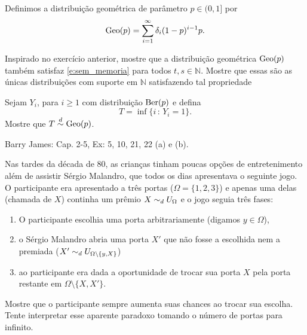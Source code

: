 Definimos a distribuição geométrica  de parâmetro $p \in (0,1]$ por
\begin{equation}
  \operatorname{Geo}(p) = \sum_{i = 1}^\infty \delta_i (1-p)^{i-1} p.
\end{equation}

\begin{exercise}
  Inspirado no exercício anterior, mostre que a distribuição geométrica $\operatorname{Geo}(p)$ também satisfaz \eqref{e:sem_memoria} para todos $t, s \in \mathbb{N}$.
  Mostre que essas são as únicas distribuições com suporte em $\mathbb{N}$ satisfazendo tal propriedade
\end{exercise}

\begin{exercise}
  \label{x:geo_time}
  Sejam $Y_i$, para $i \geq 1$ \iid com distribuição $\operatorname{Ber}(p)$ e defina
  \begin{equation}
    T = \inf\{i\, : \, Y_i = 1\}.
  \end{equation}
  Mostre que $T \overset{d}\sim \operatorname{Geo}(p)$.
\end{exercise}

\begin{exercise}
  Barry James: Cap. 2-5, Ex: 5, 10, 21, 22 (a) e (b).
\end{exercise}

\begin{exercise}
  Nas tardes da década de 80, as crianças tinham poucas opções de entretenimento além de assistir Sérgio Malandro, que todos os dias apresentava o seguinte jogo.
  O participante era apresentado a três portas ($\Omega = \{1,2,3\}$) e apenas uma delas (chamada de $X$) continha um prêmio $X \sim_d U_{\Omega}$ e o jogo seguia três fases:
  \begin{enumerate}[\quad a)]
  \item O participante escolhia uma porta arbitrariamente (digamos $y \in \Omega$),
  \item o Sérgio Malandro abria uma porta $X'$ que não fosse a escolhida nem a premiada ($X' \sim_d U_{\Omega \setminus \{y, X\}}$)
  \item ao participante era dada a oportunidade de trocar sua porta $X$ pela porta restante em $\Omega \setminus \{X, X'\}$.
  \end{enumerate}
  Mostre que o participante sempre aumenta suas chances ao trocar sua escolha.
  Tente interpretar esse aparente paradoxo tomando o número de portas para infinito.
\end{exercise}

